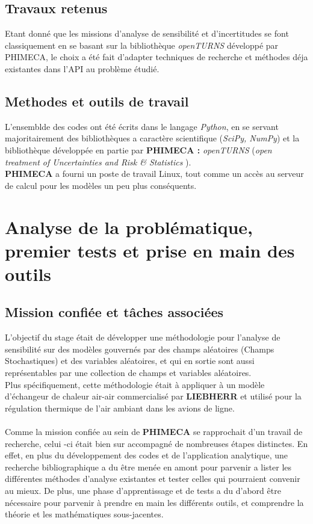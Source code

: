 \documentclass[a4paper,10pt]{article}
\begin{document}
\subsection{Travaux retenus}
Etant donné que les missions d'analyse de sensibilité et d'incertitudes se font classiquement en se basant sur la bibliothèque \textit{openTURNS} développé par PHIMECA, le choix a été fait d'adapter techniques de recherche et méthodes déja existantes dans l'API au problème étudié. 


\subsection{Methodes et outils de travail}
L'ensemblde des codes ont été écrits dans le langage \textit{Python}, en se servant majoritairement des bibliothèques a caractère scientifique (\textit{SciPy, NumPy}) et la bibliothèque développée en partie par \textbf{PHIMECA :} \textit{openTURNS} (\emph{open treatment of Uncertainties and Risk \& Statistics })\cite{OpenTURNS}.\\
\textbf{PHIMECA} a fourni un poste de travail Linux, tout comme un accès au serveur de calcul pour les modèles un peu plus conséquents. \\

\section{Analyse de la problématique, premier tests et prise en main des outils}

\subsection{Mission confiée et tâches associées}
L'objectif du stage était de développer une méthodologie pour l'analyse de sensibilité sur des modèles gouvernés par des champs aléatoires (Champs Stochastiques) et des variables aléatoires, et qui en sortie sont aussi représentables par une collection de champs et variables aléatoires. \\
Plus spécifiquement, cette méthodologie était à appliquer à un modèle d'échangeur de chaleur air-air commercialisé par \textbf{LIEBHERR} et utilisé pour la régulation thermique de l'air ambiant dans les avions de ligne.\\\\
Comme la mission confiée au sein de \textbf{PHIMECA} se rapprochait d'un travail de recherche, celui -ci était bien sur accompagné de nombreuses étapes distinctes. En effet, en plus du développement des codes et de l'application analytique, une recherche bibliographique a du être menée en amont pour parvenir a lister les différentes méthodes d'analyse existantes et tester celles qui pourraient convenir au mieux. De plus, une phase d'apprentissage et de tests a du d'abord être nécessaire pour parvenir à prendre en main les différents outils, et comprendre la théorie et les mathématiques sous-jacentes.\\
\end{document}
